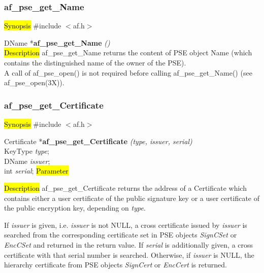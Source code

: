 \subsubsection{af\_pse\_get\_Name}
\label{af_get_Name}
\hl{Synopsis}
\#include $<$af.h$>$

DName *{\bf af\_pse\_get\_Name} {\em ()} \\
\hl{Description}
af\_pse\_get\_Name returns the content of PSE object Name (which
contains the distinguished name of the owner of the PSE).
\\ [1em]
A call of af\_pse\_open() is not required before calling af\_pse\_get\_Name()
(see af\_pse\_open(3X)).

\subsubsection{af\_pse\_get\_Certificate}
\label{af_get_Certificate}
\hl{Synopsis}
\#include $<$af.h$>$

Certificate *{\bf af\_pse\_get\_Certificate} {\em (type, issuer, serial)} \\
KeyType {\em type}; \\
DName	{\em *issuer}; \\
int	{\em serial};
\hl{Parameter}



\hl{Description}
af\_pse\_get\_Certificate returns the address of a Certificate which contains
either a user certificate of the public signature key 
or a user certificate of the public encryption key, depending on {\em type}. 

If {\em issuer} is given, i.e. {\em issuer} is not NULL, a cross certificate issued
by {\em issuer} is searched from the corresponding certificate set in PSE objects 
{\em SignCSet} or {\em EncCSet} and returned in the return value. 
If {\em serial} is additionally given, a cross
certificate with that serial number is searched. Otherwise, if {\em issuer}
is NULL, the hierarchy certificate from PSE objects {\em SignCert} or {\em EncCert}
is returned.

